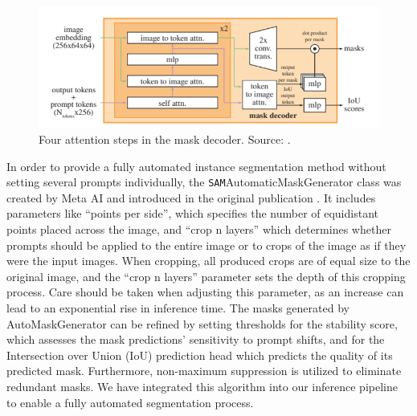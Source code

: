 \begin{figure}
	\centering
	\includegraphics[width=\textwidth]{"images/maskdecoder.png"}
	\caption[\texttt{SAM} mask decoder]{Four attention steps in the mask decoder. Source: \cite{kirillov2023segment}.}
	\label{figdecoder}
\end{figure}

In order to provide a fully automated instance segmentation method without setting several prompts individually, the \texttt{SAM}AutomaticMaskGenerator class was created by Meta AI and introduced in the original publication \cite{kirillov2023segment}. It includes parameters like ``points per side'', which specifies the number of equidistant points placed across the image, and ``crop n layers'' which determines whether prompts should be applied to the entire image or to crops of the image as if they were the input images. When cropping, all produced crops are of equal size to the original image, and the ``crop n layers'' parameter sets the depth of this cropping process. Care should be taken when adjusting this parameter, as an increase can lead to an exponential rise in inference time. The masks generated by AutoMaskGenerator can be refined by setting thresholds for the stability score, which assesses the mask predictions' sensitivity to prompt shifts, and for the Intersection over Union (IoU) prediction head which predicts the quality of its predicted mask. Furthermore, non-maximum suppression is utilized to eliminate redundant masks. We have integrated this algorithm into our inference pipeline to enable a fully automated segmentation process.